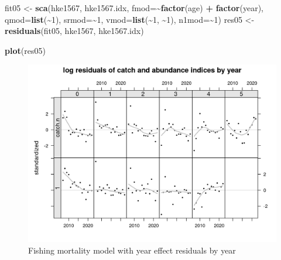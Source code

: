 \documentclass[
]{book}
\newenvironment{Shaded}{\begin{snugshade}}{\end{snugshade}}
\newcommand{\AttributeTok}[1]{\textcolor[rgb]{0.13,0.29,0.53}{#1}}
\newcommand{\DecValTok}[1]{\textcolor[rgb]{0.00,0.00,0.81}{#1}}
\newcommand{\FunctionTok}[1]{\textcolor[rgb]{0.13,0.29,0.53}{\textbf{#1}}}
\newcommand{\NormalTok}[1]{#1}
\newcommand{\OtherTok}[1]{\textcolor[rgb]{0.56,0.35,0.01}{#1}}
\newcommand{\SpecialCharTok}[1]{\textcolor[rgb]{0.81,0.36,0.00}{\textbf{#1}}}
\begin{document}
\begin{Shaded}
\begin{Highlighting}[]
\NormalTok{fit05 }\OtherTok{\textless{}{-}} \FunctionTok{sca}\NormalTok{(hke1567, hke1567.idx,}
    \AttributeTok{fmod=}\SpecialCharTok{\textasciitilde{}}\FunctionTok{factor}\NormalTok{(age) }\SpecialCharTok{+} \FunctionTok{factor}\NormalTok{(year),}
    \AttributeTok{qmod=}\FunctionTok{list}\NormalTok{(}\SpecialCharTok{\textasciitilde{}}\DecValTok{1}\NormalTok{),}
    \AttributeTok{srmod=}\SpecialCharTok{\textasciitilde{}}\DecValTok{1}\NormalTok{,}
    \AttributeTok{vmod=}\FunctionTok{list}\NormalTok{(}\SpecialCharTok{\textasciitilde{}}\DecValTok{1}\NormalTok{, }\SpecialCharTok{\textasciitilde{}}\DecValTok{1}\NormalTok{),}
    \AttributeTok{n1mod=}\SpecialCharTok{\textasciitilde{}}\DecValTok{1}\NormalTok{)}
\NormalTok{res05 }\OtherTok{\textless{}{-}} \FunctionTok{residuals}\NormalTok{(fit05, hke1567, hke1567.idx)}
\end{Highlighting}
\end{Shaded}

\begin{Shaded}
\begin{Highlighting}[]
\FunctionTok{plot}\NormalTok{(res05)}
\end{Highlighting}
\end{Shaded}

\begin{figure}
\centering
\includegraphics{_bookdown_files/_main_files/figure-html/fyearresbyyear-1.png}
\caption{\label{fig:fyearresbyyear}Fishing mortality model with year effect residuals by year}
\end{figure}
\end{document}
